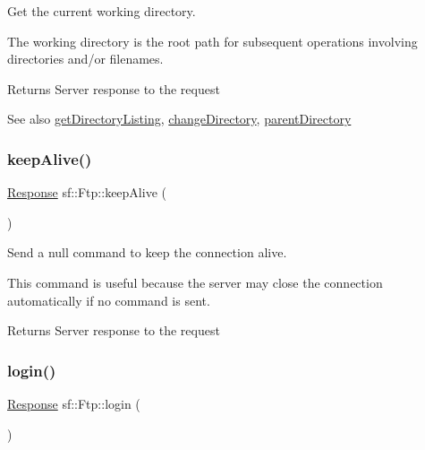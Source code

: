 Get the current working directory. 

The working directory is the root path for subsequent operations involving directories and/or filenames.

\begin{DoxyReturn}{Returns}
Server response to the request
\end{DoxyReturn}
\begin{DoxySeeAlso}{See also}
\mbox{\hyperlink{classsf_1_1_ftp_a8f37258e461fcb9e2a0655e9df0be4a0}{get\+Directory\+Listing}}, \mbox{\hyperlink{classsf_1_1_ftp_a7e93488ea6330dd4dd76e428da9bb6d3}{change\+Directory}}, \mbox{\hyperlink{classsf_1_1_ftp_ad295cf77f30f9ad07b5c401fd9849189}{parent\+Directory}} \begin{DoxyVerb}\end{DoxyVerb}
 
\end{DoxySeeAlso}
\mbox{\label{classsf_1_1_ftp_aa1127d442b4acb2105aa8060a39d04fc}} 
\subsubsection{\texorpdfstring{keepAlive()}{keepAlive()}}
{\footnotesize\ttfamily \mbox{\hyperlink{classsf_1_1_ftp_1_1_response}{Response}} sf\+::\+Ftp\+::keep\+Alive (\begin{DoxyParamCaption}{ }\end{DoxyParamCaption})}



Send a null command to keep the connection alive. 

This command is useful because the server may close the connection automatically if no command is sent.

\begin{DoxyReturn}{Returns}
Server response to the request \begin{DoxyVerb}\end{DoxyVerb}
 
\end{DoxyReturn}
\mbox{\label{classsf_1_1_ftp_a686262bc377584cd50e52e1576aa3a9b}} 
\subsubsection{\texorpdfstring{login()}{login()}\hspace{0.1cm}{\footnotesize\ttfamily [1/2]}}
{\footnotesize\ttfamily \mbox{\hyperlink{classsf_1_1_ftp_1_1_response}{Response}} sf\+::\+Ftp\+::login (\begin{DoxyParamCaption}{ }\end{DoxyParamCaption})}



